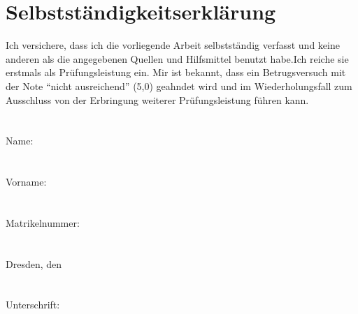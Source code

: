 \section*{Selbstständigkeitserklärung}
\label{sec:Selbstständigkeitserklärung}

Ich versichere, dass ich die vorliegende Arbeit selbstständig verfasst und keine anderen als die angegebenen Quellen und Hilfsmittel benutzt habe.Ich reiche sie erstmals als Prüfungsleistung ein. 
Mir ist bekannt, dass ein Betrugsversuch mit der Note "`nicht ausreichend"' (5,0) geahndet wird und im Wiederholungsfall zum Ausschluss von der Erbringung weiterer Prüfungsleistung führen kann.
\\\\\\
Name:
\\\\\\
Vorname:
\\\\\\
Matrikelnummer:
\\\\\\
Dresden, den
\\\\\\
Unterschrift: